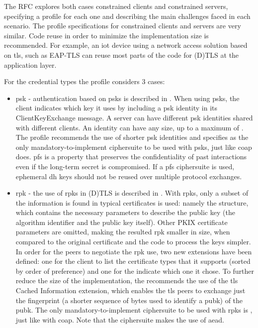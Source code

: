 \documentclass{llncs}
\begin{document}
The RFC explores both cases constrained clients and constrained servers, specifying
a profile for each one and describing the main challenges faced in each scenario.
The profile specifications for constrained clients and servers are very similar.
Code reuse in order to minimize the implementation size is recommended. For example, an \gls{iot} device
using a network access solution based on \gls{tls}, such as EAP-TLS\cite{rfc5216}
can reuse most parts of the code for (D)TLS at the application layer.

For the credential types the profile considers 3 cases:

\begin{itemize}
  \item \gls{psk} - authentication based on \gls{psk}s is described in
  \cite{RFC4279}. When using \gls{psk}s, the client indicates which
  key it uses by including a \gls{psk} identity in its ClientKeyExchange message.
  A server can have different \gls{psk} identities shared with different clients.
  An identity can have any size, up to a maximum of .
  The profile recommends the use of shorter \gls{psk} identities and specifies
   as the only mandatory-to-implement
  ciphersuite to be used with \gls{psk}s, just like \gls{coap} does. \gls{pfs} is
  a property that preserves the confidentiality of past interactions even if the
  long-term secret is compromised. If a \gls{pfs} ciphersuite is used, ephemeral
  \gls{dh} keys should not be reused over multiple protocol exchanges.

  \item \gls{rpk} - the use of \gls{rpk}s in (D)TLS is described in \cite{RFC7250}.
  With \gls{rpk}s, only a subset of the information is found in typical certificates
  is used: namely the  structure, which contains
  the necessary parameters to describe the public key (the algorithm identifier
  and the public key itself). Other PKIX certificate\cite{RFCabc} parameters are
  omitted, making the resulted \gls{rpk} smaller in size, when compared to the
  original certificate and the code to process the keys simpler. In order for the
  peers to negotiate the \gls{rpk} use, two new extensions have been defined:
  one for the client to list the certificate types that it supports (sorted by order of preference) and one for
  the indicate which one it chose. To further reduce the size of the implementation, the 
  recommends the use of the \gls{tls} Cached Information extension\cite{RFC7924}, which
  enables the \gls{tls} peers to exchange just the fingerprint (a shorter sequence of bytes
  used to identify a \gls{pubk}) of the \gls{pubk}. The only mandatory-to-implement
  ciphersuite to be used with \gls{rpk}s is ,
  just like with \gls{coap}. Note that the ciphersuite makes the use of \gls{aead}.


\end{itemize}
\end{document}
